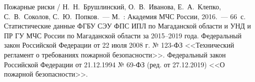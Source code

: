 \begin{thebibliography}{99}
\bibitem{}Пожарные риски / Н.~Н.~Брушлинский, О.~В.~Иванова, Е.~А.~Клепко, С.~В.~Соколов, С.~Ю.~Попков.~--- М.~: Академия МЧС России, 2016.~--- 66~с.
\bibitem{}Статистические данные ФГБУ СЭУ ФПС ИПЛ по Магаданской области и УНД и ПР ГУ МЧС России по Магаданской области за 2015--2019 года.
\bibitem{}Федеральный закон Российской Федерации от 22 июля 2008 г. № 123-ФЗ  <<Технический регламент о требованиях пожарной безопасности>>.
\bibitem{}Федеральный закон Российской Федерации от 21.12.1994 № 69-ФЗ (ред. от 27.12.2019) <<О пожарной безопасности>>.
\end{thebibliography}
